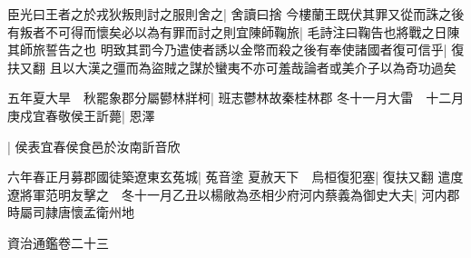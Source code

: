 臣光曰王者之於戎狄叛則討之服則舍之|{
	舍讀曰捨}
今樓蘭王既伏其罪又從而誅之後有叛者不可得而懷矣必以為有罪而討之則宜陳師鞠旅|{
	毛詩注曰鞠告也將戰之日陳其師旅誓告之也}
明致其罰今乃遣使者誘以金幣而殺之後有奉使諸國者復可信乎|{
	復扶又翻}
且以大漢之彊而為盜賊之謀於蠻夷不亦可羞哉論者或美介子以為奇功過矣

五年夏大旱　秋罷象郡分屬鬰林牂柯|{
	班志鬱林故秦桂林郡}
冬十一月大雷　十二月庚戍宜春敬侯王訢薨|{
	恩澤}


|{
	侯表宜春侯食邑於汝南訢音欣}


六年春正月募郡國徒築遼東玄菟城|{
	菟音塗}
夏赦天下　烏桓復犯塞|{
	復扶又翻}
遣度遼將軍范明友擊之　冬十一月乙丑以楊敞為丞相少府河内蔡義為御史大夫|{
	河内郡時屬司隷唐懷孟衛州地}


資治通鑑卷二十三






















































































